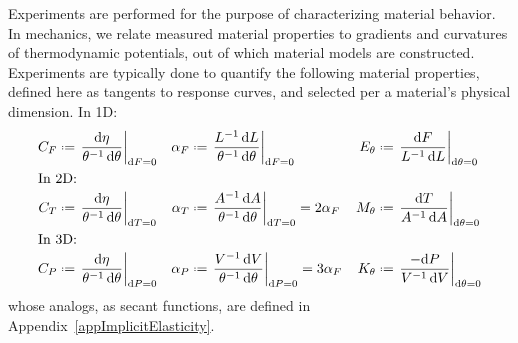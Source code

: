 Experiments are performed for the purpose of characterizing material behavior.  In mechanics, we relate measured material properties to gradients and curvatures of thermo\-dynamic potentials, out of which material models are constructed.  Experiments are typically done to quantify the following material properties, defined here as tangents to response curves, and selected per a material's physical dimension. 
\newline
In 1D:
\begin{subequations}
    \label{materialConstants}
    \begin{align}
    C_F & \defeq \left. \frac{\mathrm{d} \eta}
    {\theta^{-1} \, \mathrm{d}\theta} \right|_{\mathrm{d}F=0} & 
    \alpha_F & \defeq \left. \frac{L^{-1} \, \mathrm{d}L}
    {\theta^{-1} \, \mathrm{d} \theta} \right|_{\mathrm{d}F=0} &
    E_{\theta} & \defeq \left. \frac{\mathrm{d}F}
    {L^{-1} \, \mathrm{d}L} \right|_{\mathrm{d}\theta=0} \\
    \intertext{In 2D:}
    C_T & \defeq \left. \frac{\mathrm{d} \eta}
    {\theta^{-1} \, \mathrm{d}\theta} \right|_{\mathrm{d}T=0} & 
    \alpha_T & \defeq \left. \frac{A^{-1} \, \mathrm{d}A}
    {\theta^{-1} \, \mathrm{d} \theta} \right|_{\mathrm{d}T=0} =
    2 \alpha_F &
    M_{\theta} & \defeq \left. \frac{\mathrm{d}T}
    {A^{-1} \, \mathrm{d}A} \right|_{\mathrm{d}\theta=0} \\
    \intertext{In 3D:}
    C_P & \defeq \left. \frac{\mathrm{d} \eta}
    {\theta^{-1} \, \mathrm{d}\theta} \right|_{\mathrm{d}P=0} & 
    \alpha_P & \defeq \left. \frac{V^{-1} \, \mathrm{d}V}
    {\theta^{-1} \, \mathrm{d} \theta} \right|_{\mathrm{d}P=0} = 
    3 \alpha_F &
    K_{\theta} & \defeq \left. \frac{-\mathrm{d}P}
    {V^{-1} \, \mathrm{d}V} \right|_{\mathrm{d}\theta=0} 
    \end{align}
\end{subequations}
whose analogs, as secant functions, are defined in Appendix~\ref{appImplicitElasticity}.

